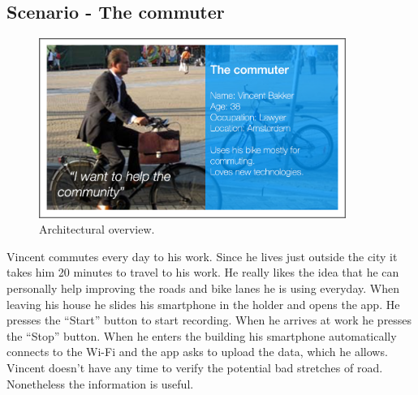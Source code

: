 \documentclass[preprint,12pt]{elsarticle}
\theoremstyle{definition}
\begin{document}
\subsection{Scenario - The commuter}
\begin{figure}[ht]
\begin{center}
\includegraphics[width=100mm]{figures/commuter}
\caption{Architectural overview.\label{fig:sys}}
\end{center}
\end{figure}
Vincent commutes every day to his work. Since he lives just outside the city it takes him 20 minutes to travel to his work. He really likes the idea that he can personally help improving the roads and bike lanes he is using everyday.
When leaving his house he slides his smartphone in the holder and opens the app. He presses the “Start” button to start recording.
When he arrives at work he presses the “Stop” button. When he enters the building his smartphone automatically connects to the Wi-Fi and the app asks to upload the data, which he allows. Vincent doesn’t have any time to verify the potential bad stretches of road. Nonetheless the information is useful.
\end{document}
